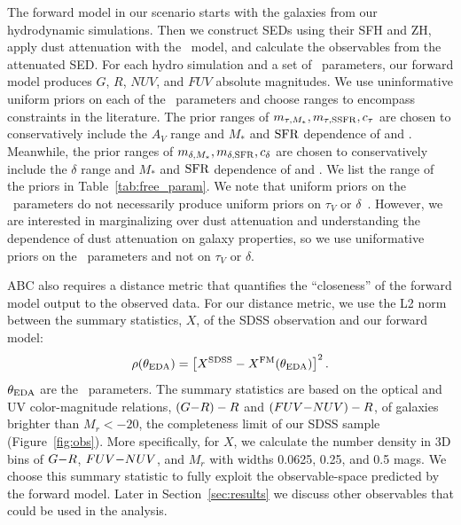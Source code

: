 The forward model in our scenario starts with the galaxies from our
hydrodynamic simulations. Then we construct SEDs using their SFH and ZH,
apply dust attenuation with the \eda~model, and calculate the observables from
the attenuated SED. For each hydro simulation and a set of \eda~parameters, our forward model
produces $G$, $R$, $NUV$, and $FUV$ absolute magnitudes. We use uninformative uniform priors on each of
the \eda~parameters and choose ranges to encompass constraints in the
literature. The prior ranges of $m_{\tau,M_*}, m_{\tau,{\rm SSFR}}, c_\tau$ are chosen to
conservatively include the $A_V$ range and $M_*$ and ${\rm SFR}$ dependence of
\cite{narayanan2018} and \cite{salim2020}. Meanwhile, the prior ranges of 
$m_{\delta,M_*}, m_{\delta,{\rm SFR}}, c_\delta$ are chosen to conservatively include the $\delta$
range and $M_*$ and ${\rm SFR}$ dependence of \cite{leja2017} and \cite{salim2018}. 
We list the range of the priors in Table~\ref{tab:free_param}. We note that
uniform priors on the \eda~parameters do not necessarily produce uniform priors 
on $\tau_V$ or $\delta$~\citep[\eg][]{handley2019}. However, we are interested in
marginalizing over dust attenuation and understanding the dependence of dust
attenuation on galaxy properties, so we use uniformative priors on the
\eda~parameters and not on $\tau_V$ or $\delta$. 

ABC also requires a distance metric that quantifies the ``closeness'' of the
forward model output to the observed data. For our distance metric, we use the
L2 norm between the summary statistics, $X$, of the SDSS observation and our 
forward model: 
\begin{equation} \label{eq:distance}
    \rho(\theta_{\rm \eda}) = \left[X^{\rm SDSS} - X^{\rm FM}(\theta_{\rm
    \eda}) \right]^2.
\end{equation}
$\theta_{\rm EDA}$ are the \eda~parameters. 
The summary statistics are based on the optical and UV color-magnitude
relations, $(G{-}R)-R$ and $(FUV{-}NUV)-R$, of galaxies brighter than $M_r < -20$,
the completeness limit of our SDSS sample (Figure~\ref{fig:obs}).
More specifically, for $X$, we calculate the number density in 3D bins of $G{-}R$,
$FUV{-}NUV$, and $M_r$ with widths 0.0625, 0.25, and 0.5 mags. We choose this summary 
statistic to fully exploit the observable-space predicted by the forward model. 
Later in Section~\ref{sec:results} we discuss other observables that could be
used in the analysis. 

